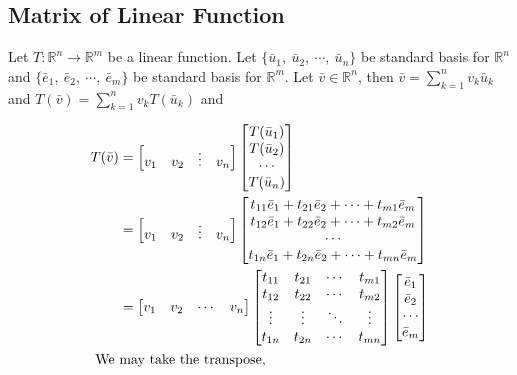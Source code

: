\subsection{Matrix of Linear Function}
Let $T : \mathbb{R}^n \to \mathbb{R}^m$ be a linear function.
Let $\{\bar{u}_1,\ \bar{u}_2,\ \cdots,\ \bar{u}_n\}$ be standard basis for $\mathbb{R}^n$ and  $\{\bar{e}_1,\ \bar{e}_2,\ \cdots,\ \bar{e}_m\}$ be standard basis for $\mathbb{R}^m$.
Let $\bar{v} \in \mathbb{R}^n$, then $\bar{v} = \sum_{k=1}^n v_k\bar{u}_k$ and $T(\bar{v}) = \sum_{k=1}^n v_k T(\bar{u}_k)$ and
\begin{commentary}
\begin{align*}
	T(\bar{v}) & =  \begin{bmatrix} v_1 & v_2 & \vdots & v_n  \end{bmatrix} \begin{bmatrix} T(\bar{u}_1) \\ T(\bar{u}_2) \\ \cdots \\ T(\bar{u}_n) \end{bmatrix} \\
	& =  \begin{bmatrix} v_1 & v_2 & \vdots & v_n  \end{bmatrix}\begin{bmatrix} t_{11}\bar{e}_1+t_{21}\bar{e}_2+\cdots+t_{m1}\bar{e}_m \\ t_{12}\bar{e}_1+t_{22}\bar{e}_2+\cdots+t_{m2}\bar{e}_m \\ \cdots \\ t_{1n}\bar{e}_1+t_{2n}\bar{e}_2+\cdots+t_{mn}\bar{e}_m \end{bmatrix} \\
	& = \begin{bmatrix} v_1 & v_2 & \cdots & v_n  \end{bmatrix} \begin{bmatrix} t_{11} & t_{21} & \cdots & t_{m1} \\ t_{12} & t_{22} & \cdots & t_{m2} \\ \vdots & \vdots & \ddots & \vdots \\ t_{1n} & t_{2n} & \cdots & t_{mn} \end{bmatrix} \begin{bmatrix} \bar{e}_1 \\ \bar{e}_2 \\ \cdots \\ \bar{e}_m \end{bmatrix} \\
	\intertext{ We may take the transpose,}

\end{align*}
\end{commentary}
